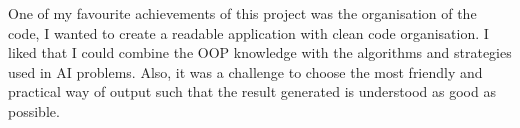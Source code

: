 \documentclass[12pt]{article}
\begin{document}
\begin{justify}
\tab One of my favourite achievements of this project was the organisation of the code, I wanted to create a readable application with clean code organisation. I liked that I could combine the OOP knowledge with the algorithms and strategies used in AI problems. Also, it was a challenge to choose the most friendly and practical way of output such that the result generated is understood as good as possible.
\end{justify}\par


\vspace{\baselineskip}

\printbibliography
\end{document}
